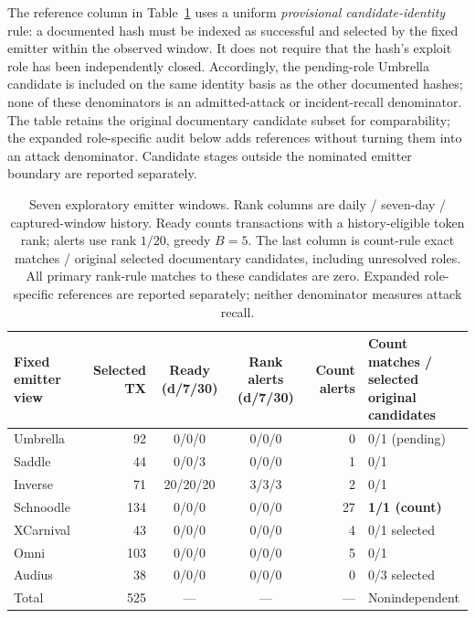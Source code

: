 \documentclass[preprint,12pt,authoryear]{elsarticle}
\begin{document}
The reference column in Table~\ref{tab:sevenstreams} uses a uniform \emph{provisional candidate-identity} rule: a documented hash must be indexed as successful and selected by the fixed emitter within the observed window. It does not require that the hash's exploit role has been independently closed. Accordingly, the pending-role Umbrella candidate is included on the same identity basis as the other documented hashes; none of these denominators is an admitted-attack or incident-recall denominator. The table retains the original documentary candidate subset for comparability; the expanded role-specific audit below adds references without turning them into an attack denominator. Candidate stages outside the nominated emitter boundary are reported separately.

\begin{table}[htbp]
\centering\scriptsize
\caption{Seven exploratory emitter windows. Rank columns are daily / seven-day / captured-window history. Ready counts transactions with a history-eligible token rank; alerts use rank $1/20$, greedy $B=5$. The last column is count-rule exact matches / original selected documentary candidates, including unresolved roles. All primary rank-rule matches to these candidates are zero. Expanded role-specific references are reported separately; neither denominator measures attack recall.}
\label{tab:sevenstreams}
\setlength{\tabcolsep}{4pt}
\begin{tabularx}{\linewidth}{@{}>{\raggedright\arraybackslash}X r c c r l@{}}
\toprule
Fixed emitter view & Selected TX & Ready (d/7/30) & Rank alerts (d/7/30) & Count alerts & \shortstack{Count matches /\\selected original\\candidates} \\
\midrule
Umbrella & 92 & 0/0/0 & 0/0/0 & 0 & 0/1 (pending) \\
Saddle & 44 & 0/0/3 & 0/0/0 & 1 & 0/1 \\
Inverse & 71 & 20/20/20 & 3/3/3 & 2 & 0/1 \\
Schnoodle & 134 & 0/0/0 & 0/0/0 & 27 & \textbf{1/1 (count)} \\
XCarnival & 43 & 0/0/0 & 0/0/0 & 4 & 0/1 selected \\
Omni & 103 & 0/0/0 & 0/0/0 & 5 & 0/1 \\
Audius & 38 & 0/0/0 & 0/0/0 & 0 & 0/3 selected \\
\midrule
Total & 525 & --- & --- & --- & Nonindependent \\
\bottomrule
\end{tabularx}
\end{table}
\end{document}

